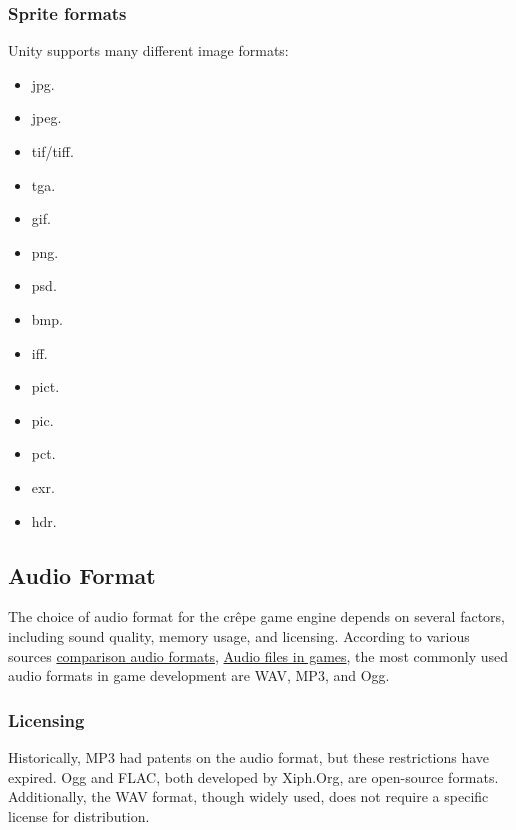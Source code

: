 \documentclass{projdoc}
\begin{document}
\subsubsection{Sprite formats}

Unity supports many different image formats:\noparbreak
\begin{multicols}{5}
\begin{itemize}
	\item jpg.
	\item jpeg.
	\item tif/tiff.
	\item tga.
	\item gif.
	\item png.
	\item psd.
	\item bmp.
	\item iff.
	\item pict.
	\item pic.
	\item pct.
	\item exr.
	\item hdr.
\end{itemize}
\end{multicols}

\subsection{Audio Format}

The choice of audio format for the cr\^epe game engine depends on several factors,
including sound quality, memory usage, and licensing. According to various sources
\href{https://dev.to/tenry/comparison-of-audio-formats-for-games-jak}{comparison audio formats},
\href{https://www.universityofgames.net/articles/audio-file-formats-used-in-game-development/}{Audio files in games},
the most commonly used audio formats in game development are WAV, MP3, and Ogg.

\subsubsection{Licensing}

Historically, MP3 had patents on the audio format, but these restrictions have
expired. Ogg and FLAC, both developed by Xiph.Org, are open-source formats.
Additionally, the WAV format, though widely used, does not require a specific license
for distribution.
\end{document}
